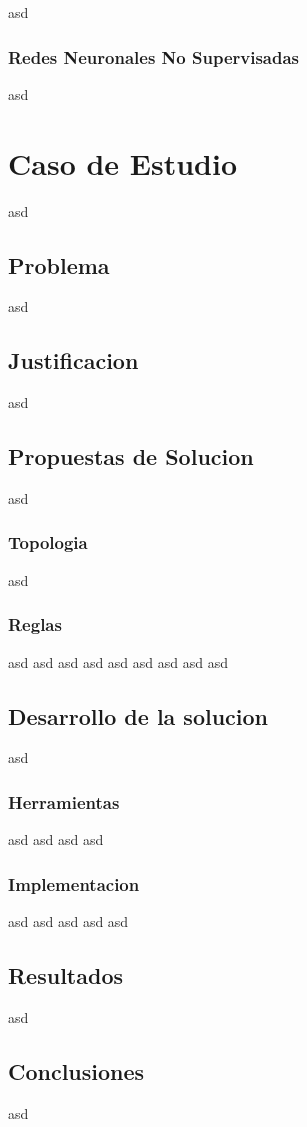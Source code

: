 \documentclass[12pt]{article}
\newcounter{subsubsubsection}[subsubsection]
\newcounter{subsubsubsubsection}[subsubsubsection]
\begin{document}
asd
\subsubsection{Redes Neuronales No Supervisadas}
asd


\section{Caso de Estudio}
asd
\subsection{Problema}
asd
\subsection{Justificacion}
asd
\subsection{Propuestas de Solucion}
asd
\subsubsection{Topologia}
asd
\subsubsection{Reglas}
asd
asd
asd
asd
asd
asd
asd
asd
asd

\subsection{Desarrollo de la solucion}
asd
\subsubsection{Herramientas}
asd
asd
asd
asd
\subsubsection{Implementacion}
asd
asd
asd
asd
asd

\subsection{Resultados}
asd
\subsection{Conclusiones}
asd






\end{document}
